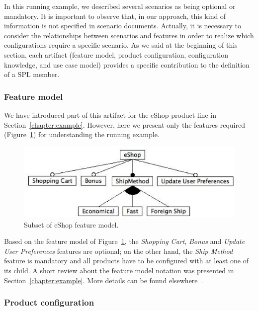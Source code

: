 \documentclass[11pt]{report}
\begin{document}
In this running example, we described several scenarios as being optional or
mandatory. It is important to observe that, in our approach, this kind of
information is not specified in scenario documents. Actually, it is necessary to
consider the relationships between scenarios and features in order to realize
which configurations require a specific scenario. As we said at the beginning of
this section, each artifact (feature model, product configuration, configuration
knowledge, and use case model) provides a specific contribution to the definition
of a SPL member.

\subsubsection{Feature model}\label{subsub:fm}

We have introduced part of this artifact for the eShop product line in
Section~\ref{chapter:example}. However, here we present only the features required 
(Figure~\ref{fig:eshop-fm-re}) for understanding the running example.

 \begin{figure}[h]
 \begin{center}
  \includegraphics[scale=0.40]{img/eShop-fm-re.eps}
    \caption{Subset of eShop feature model.}
  \label{fig:eshop-fm-re}
  \end{center}
\end{figure}

Based on the feature model of Figure~\ref{fig:eshop-fm-re}, the \emph{Shopping
Cart}, \emph{Bonus} and \emph{Update User Preferences} features are optional;
on the other hand, the \emph{Ship Method} feature is mandatory and all products
have to be configured with at least one of its child. A short review about the
feature model notation was presented in Section~\ref{chapter:example}. More details
can be found elsewhere~\cite{gheyi-alloy-06,czarnecki-book}.

\subsubsection{Product configuration}\label{subsub:pc}
\end{document}
